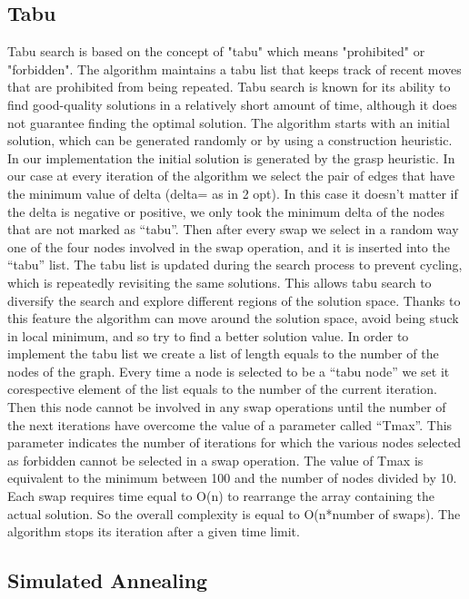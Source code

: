 \subsection{Tabu}
Tabu search is based on the concept of "tabu" which means "prohibited" or "forbidden". The algorithm maintains a tabu list that keeps track of recent moves that are prohibited from being repeated. 
Tabu search is known for its ability to find good-quality solutions in a relatively short amount of time, although it does not guarantee finding the optimal solution.
The algorithm starts with an initial solution, which can be generated randomly or by using a construction heuristic. In our implementation the initial solution is generated by the grasp heuristic.
In our case at every iteration of the algorithm we select the pair of edges that have the minimum value of delta (delta= as in 2 opt). In this case it doesn't matter if the delta is negative or positive, we only took the minimum delta of the nodes that are not marked as “tabu”.  Then after every swap we select in a random way one of the four nodes involved in the swap operation, and it is inserted into the “tabu” list.
The tabu list is updated during the search process to prevent cycling, which is repeatedly revisiting the same solutions. This allows tabu search to diversify the search and explore different regions of the solution space. Thanks to this feature the algorithm can move around the solution space, avoid being stuck in local minimum, and so try to find a better solution value.
In order to implement the tabu list we create a list of length equals to the number of the nodes of the graph. Every time a node is selected to be a “tabu node” we set it corespective element of the list equals to the number of the current iteration. Then this node cannot be involved in any swap operations until the number of the next iterations have overcome the value of a parameter called “Tmax”. This parameter indicates the number of iterations for which the various nodes selected as forbidden cannot be selected in a swap operation.
The value of Tmax is equivalent to the minimum between 100 and the number of nodes divided by 10.
Each swap requires time equal to O(n) to rearrange the array containing the actual solution. So the overall complexity is equal to O(n*number of swaps).
The algorithm stops its iteration after a given time limit.



\subsection{Simulated Annealing}

